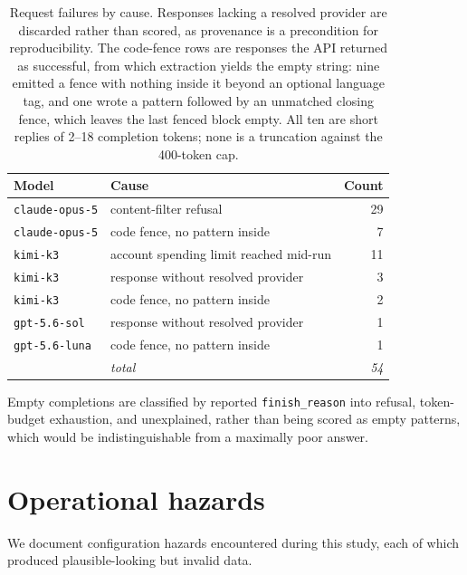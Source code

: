 \documentclass[11pt]{article}
\begin{document}
\begin{table}[htbp]
\centering
\small
\begin{tabular}{llr}
\toprule
Model & Cause & Count \\
\midrule
\texttt{claude-opus-5} & content-filter refusal & 29 \\
\texttt{claude-opus-5} & code fence, no pattern inside & 7 \\
\texttt{kimi-k3} & account spending limit reached mid-run & 11 \\
\texttt{kimi-k3} & response without resolved provider & 3 \\
\texttt{kimi-k3} & code fence, no pattern inside & 2 \\
\texttt{gpt-5.6-sol} & response without resolved provider & 1 \\
\texttt{gpt-5.6-luna} & code fence, no pattern inside & 1 \\
\midrule
& \textit{total} & \textit{54} \\
\bottomrule
\end{tabular}
\caption{Request failures by cause. Responses lacking a resolved provider are
discarded rather than scored, as provenance is a precondition for
reproducibility. The code-fence rows are responses the API returned as
successful, from which extraction yields the empty string: nine emitted a
fence with nothing inside it beyond an optional language tag, and one wrote a
pattern followed by an unmatched closing fence, which leaves the last fenced
block empty. All ten are short replies of 2--18 completion tokens; none is a
truncation against the 400-token cap.}
\end{table}

Empty completions are classified by reported \texttt{finish\_reason} into
refusal, token-budget exhaustion, and unexplained, rather than being scored
as empty patterns, which would be indistinguishable from a maximally poor
answer.

\section{Operational hazards}
\label{app:hazards}

We document configuration hazards encountered during this study, each of
which produced plausible-looking but invalid data.
\end{document}
